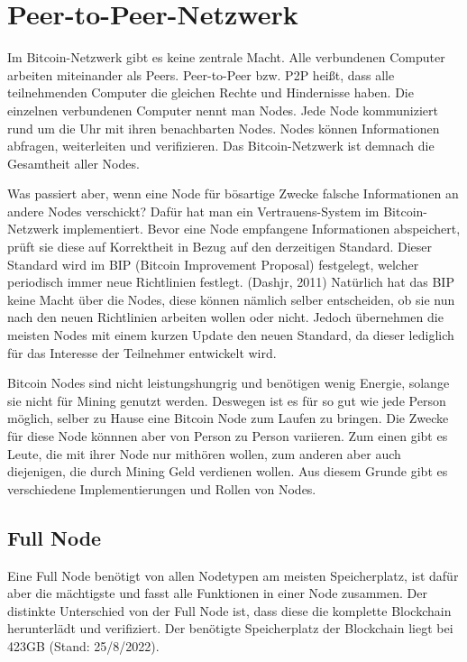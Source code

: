 \section{Peer-to-Peer-Netzwerk}
Im Bitcoin-Netzwerk gibt es keine zentrale Macht. Alle verbundenen Computer arbeiten miteinander als Peers. Peer-to-Peer
bzw. P2P heißt, dass alle teilnehmenden Computer die gleichen Rechte und Hindernisse haben. Die einzelnen verbundenen Computer
nennt man Nodes. Jede Node kommuniziert rund um die Uhr mit ihren benachbarten Nodes. Nodes können Informationen abfragen, 
weiterleiten und verifizieren. Das Bitcoin-Netzwerk ist demnach die Gesamtheit aller Nodes.

Was passiert aber, wenn eine Node für bösartige Zwecke falsche Informationen an andere Nodes verschickt? Dafür hat man ein
Vertrauens-System im Bitcoin-Netzwerk implementiert. Bevor eine Node empfangene Informationen abspeichert, prüft sie diese
auf Korrektheit in Bezug auf den derzeitigen Standard. Dieser Standard wird im BIP (Bitcoin Improvement Proposal) festgelegt,
welcher periodisch immer neue Richtlinien festlegt. (Dashjr, 2011) Natürlich hat das BIP keine Macht über die Nodes, diese können nämlich
selber entscheiden, ob sie nun nach den neuen Richtlinien arbeiten wollen oder nicht. Jedoch übernehmen die meisten Nodes mit
einem kurzen Update den neuen Standard, da dieser lediglich für das Interesse der Teilnehmer entwickelt wird.

Bitcoin Nodes sind nicht leistungshungrig und benötigen wenig Energie, solange sie nicht für Mining genutzt werden. Deswegen ist
es für so gut wie jede Person möglich,
selber zu Hause eine Bitcoin Node zum Laufen zu bringen. Die Zwecke für diese Node könnnen aber von Person zu Person variieren.
Zum einen gibt es Leute, die mit ihrer Node nur mithören wollen, zum anderen aber auch diejenigen, die durch Mining Geld
verdienen wollen. Aus diesem Grunde gibt es verschiedene Implementierungen und Rollen von Nodes.

\subsection{Full Node}
Eine Full Node benötigt von allen Nodetypen am meisten Speicherplatz, ist dafür aber die mächtigste und fasst alle Funktionen in 
einer Node zusammen. Der distinkte Unterschied von der Full Node ist, dass diese die komplette Blockchain herunterlädt und
verifiziert. Der benötigte Speicherplatz der Blockchain liegt bei 423GB (Stand: 25/8/2022).


